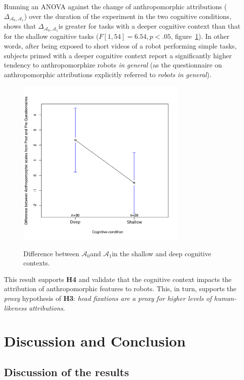 \documentclass[lettersize, noapacite, twoside, HRI]{apa_HRI}
\newcommand{\h}[1]{\textbf{H#1}\xspace}
\newcommand{\anti}{{$\mathcal{A}_0$\xspace}}
\newcommand{\antf}{{$\mathcal{A}_1$\xspace}}
\newcommand{\deltaant}{{ $\Delta_{\mathcal{A}_0,\mathcal{A}_1}$\xspace}}
\begin{document}
Running an ANOVA against the change of anthropomorphic attributions
(\deltaant) over the duration of the experiment in the two cognitive
conditions, shows that \deltaant is greater for tasks with a deeper cognitive
context than that for the shallow cognitive tasks ($F[1,54] = 6.54, p < .05$,
figure~\ref{h4}). In other words, after being exposed to short videos of a robot
performing simple tasks, subjects primed with a deeper cognitive context report
a significantly higher tendency to anthropomorphize robots \emph{in general} (as
the questionnaire on anthropomorphic attributions explicitly referred to
\emph{robots in general}).

\begin{figure}
    \centering
    \includegraphics[width=3.3in]{H4}\label{ICAtoAAPImprovement}
    \caption{Difference between \anti and \antf in the shallow and deep
    cognitive contexts.}
    \label{h4}
\end{figure}

This result supports \h{4} and validate that the cognitive context impacts the
attribution of anthropomorphic features to robots. This, in turn, supports the
\emph{proxy} hypothesis of \h{3}: \emph{head fixations are a proxy for higher
levels of human-likeness attributions}.


\section{Discussion and Conclusion}

\subsection{Discussion of the results}
\end{document}
